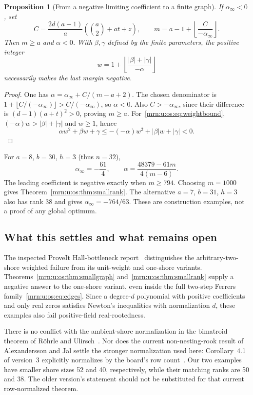 \documentclass[11pt,a4paper]{article}
\newtheorem{proposition}[theorem]{Proposition}
\theoremstyle{remark}\newtheorem{remark}[theorem]{Remark}
\begin{document}
\begin{proposition}[From a negative limiting coefficient to a finite graph]\label{mrn:u:os:prop:finite}
If $\alpha_\infty<0$, set
\[
 C=\frac{2d(a-1)}a\left(\binom a2+at+z\right),\qquad
 m=a-1+\left\lfloor\frac{C}{-\alpha_\infty}\right\rfloor.
\]
Then $m\ge a$ and $\alpha<0$. With $\beta,\gamma$ defined by the finite parameters, the positive integer
\begin{equation}\label{mrn:u:os:eq:weightbound}
 w=1+\left\lfloor\frac{|\beta|+|\gamma|}{-\alpha}\right\rfloor
\end{equation}
necessarily makes the last margin negative.
\end{proposition}
\begin{proof}
One has $\alpha=\alpha_\infty+C/(m-a+2)$. The chosen denominator is $1+\lfloor C/(-\alpha_\infty)\rfloor>C/(-\alpha_\infty)$, so $\alpha<0$. Also $C> -\alpha_\infty$, since their difference is $(d-1)(a+t)^2>0$, proving $m\ge a$. For~\eqref{mrn:u:os:eq:weightbound}, $(-\alpha)w>|\beta|+|\gamma|$ and $w\ge1$, hence
\[
 \alpha w^2+\beta w+\gamma
 \le -(-\alpha)w^2+|\beta|w+|\gamma|<0.
\]
\end{proof}
For $a=8$, $b=30$, $h=3$ (thus $n=32$),
\[
 \alpha_\infty=-\frac{61}{4},\qquad
 \alpha=\frac{48379-61m}{4(m-6)}.
\]
The leading coefficient is negative exactly when $m\ge794$. Choosing $m=1000$ gives Theorem~\ref{mrn:u:os:thm:smallrank}. The alternative $a=7$, $b=31$, $h=3$ also has rank 38 and gives $\alpha_\infty=-764/63$. These are construction examples, not a proof of any global optimum.

\subsection{What this settles and what remains open}
The inspected ProveIt Hall-bottleneck report~\cite{b:HallMS} distinguishes the arbitrary-two-shore weighted failure from its unit-weight and one-shore variants. Theorems~\ref{mrn:u:os:thm:smallgraph} and~\ref{mrn:u:os:thm:smallrank} supply a negative answer to the one-shore variant, even inside the full two-step Ferrers family~\eqref{mrn:u:os:eq:edges}. Since a degree-$d$ polynomial with positive coefficients and only real zeros satisfies Newton's inequalities with normalization $d$, these examples also fail positive-field real-rootedness.

There is no conflict with the ambient-shore normalization in the bimatroid theorem of R\"ohrle and Ulirsch~\cite{b:RU}. Nor does the current non-nesting-rook result of Alexandersson and Jal settle the stronger normalization used here: Corollary~4.1 of version~3 explicitly normalizes by the board's row count~\cite{b:AJ}. Our two examples have smaller shore sizes 52 and 40, respectively, while their matching ranks are 50 and 38. The older version's statement should not be substituted for that current row-normalized theorem.
\end{document}

